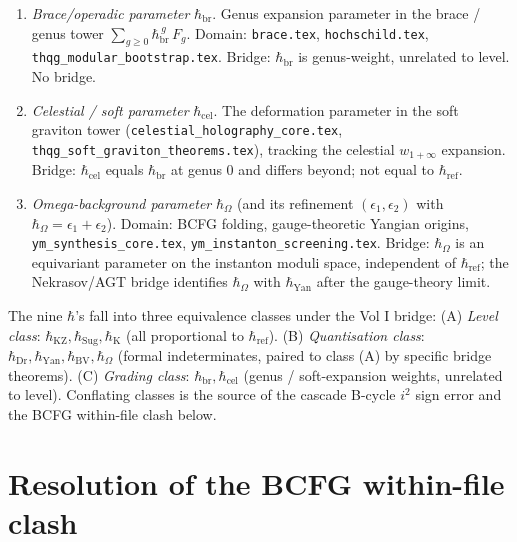 \begin{enumerate}
 $\hbar_{\mathrm{BV}} = \hbar_{\mathrm{ref}}$ is the content of the
 Costello--Li reduction.
\item[(7)] \emph{Brace/operadic parameter} $\hbar_{\mathrm{br}}$.
 Genus expansion parameter in the brace / genus tower
 $\sum_{g\ge 0} \hbar_{\mathrm{br}}^{\,g}\,F_g$.
 Domain: \texttt{brace.tex}, \texttt{hochschild.tex},
 \texttt{thqg\_modular\_bootstrap.tex}.
 Bridge: $\hbar_{\mathrm{br}}$ is genus-weight, unrelated to level. No bridge.
\item[(8)] \emph{Celestial / soft parameter} $\hbar_{\mathrm{cel}}$.
 The deformation parameter in the soft graviton tower
 (\texttt{celestial\_holography\_core.tex},
 \texttt{thqg\_soft\_graviton\_theorems.tex}), tracking the celestial
 $w_{1+\infty}$ expansion.
 Bridge: $\hbar_{\mathrm{cel}}$ equals $\hbar_{\mathrm{br}}$ at genus $0$ and
 differs beyond; not equal to $\hbar_{\mathrm{ref}}$.
\item[(9)] \emph{Omega-background parameter} $\hbar_{\Omega}$ (and its
 refinement $(\epsilon_{1},\epsilon_{2})$ with $\hbar_{\Omega}=\epsilon_{1}+\epsilon_{2}$).
 Domain: BCFG folding, gauge-theoretic Yangian origins,
 \texttt{ym\_synthesis\_core.tex},
 \texttt{ym\_instanton\_screening.tex}.
 Bridge: $\hbar_{\Omega}$ is an equivariant parameter on the instanton moduli
 space, independent of $\hbar_{\mathrm{ref}}$; the Nekrasov/AGT bridge
 identifies $\hbar_{\Omega}$ with $\hbar_{\mathrm{Yan}}$ after the gauge-theory
 limit.
\end{enumerate}

\begin{remark}
The nine $\hbar$'s fall into three equivalence classes under the Vol I bridge:
(A) \emph{Level class}: $\hbar_{\mathrm{KZ}},\hbar_{\mathrm{Sug}},\hbar_{\mathrm{K}}$
(all proportional to $\hbar_{\mathrm{ref}}$). (B) \emph{Quantisation class}:
$\hbar_{\mathrm{Dr}},\hbar_{\mathrm{Yan}},\hbar_{\mathrm{BV}},\hbar_{\Omega}$
(formal indeterminates, paired to class (A) by specific bridge theorems). (C)
\emph{Grading class}: $\hbar_{\mathrm{br}},\hbar_{\mathrm{cel}}$ (genus /
soft-expansion weights, unrelated to level). Conflating classes is the source
of the cascade B-cycle $i^{2}$ sign error and the BCFG within-file clash below.
\end{remark}

\section{Resolution of the BCFG within-file clash}
\label{sec:bcfg-hbar-resolution}


